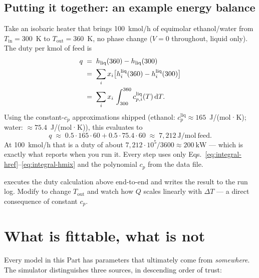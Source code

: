 \documentclass[11pt,a4paper]{article}
\begin{document}
\subsection{Putting it together: an example energy balance}

Take an isobaric heater that brings 100~kmol/h of equimolar
ethanol/water from $T_{\mathrm{in}} = 300$~K to $T_{\mathrm{out}} =
360$~K, no phase change ($V = 0$ throughout, liquid only).  The
duty per kmol of feed is
\begin{align}
   q &\;=\; h_{\mathrm{liq}}(360) - h_{\mathrm{liq}}(300) \notag\\
     &\;=\; \sum_i x_i \bigl[h^{\mathrm{liq}}_i(360) - h^{\mathrm{liq}}_i(300)\bigr] \notag\\
     &\;=\; \sum_i x_i\,\int_{300}^{360} c_{p,i}^{\mathrm{liq}}(T)\,\mathrm{d}T.
\end{align}
Using the constant-$c_p$ approximations shipped 
(ethanol: $c_p^{\mathrm{liq}} \approx 165$~J/(mol·K); water:
$\approx 75.4$~J/(mol·K)), this evaluates to
\[
   q \;\approx\; 0.5 \cdot 165 \cdot 60 + 0.5 \cdot 75.4 \cdot 60
     \;\approx\; 7{,}212~\mathrm{J/mol \ feed}.
\]
At 100~kmol/h that is a duty of about
$7{,}212 \cdot 10^5 / 3600 \approx 200~\mathrm{kW}$ --- which is
exactly what  reports when you run it.
Every step uses only Eqs.~\eqref{eq:integral-href}--\eqref{eq:integral-hmix}
and the polynomial $c_p$ from the data file.

\begin{tutoriallink}
 executes the duty calculation
above end-to-end and writes the result to the run log.  Modify
 to change
$T_{\mathrm{out}}$ and watch how $Q$ scales linearly with
$\Delta T$ --- a direct consequence of constant $c_p$.
\end{tutoriallink}

\section{What is fittable, what is not}\label{ch:fittable}

Every model in this Part has parameters that ultimately come from
\emph{somewhere}. The simulator distinguishes three sources, in
descending order of trust:
\end{document}
